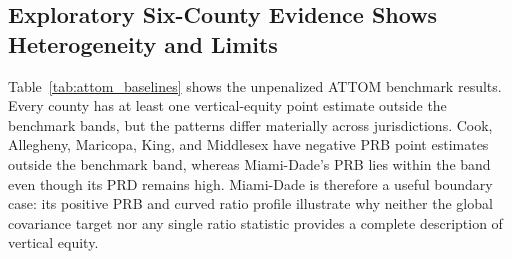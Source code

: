 \documentclass[10pt]{article}
\theoremstyle{definition}
\newcommand{\1}{\mathbf{1}}
\newcommand{\oldtext}[1]{\textcolor{blue}{\sout{#1}}}
\newcommand{\newtext}[1]{\textcolor{impGreen}{#1}}
\begin{document}
\subsection{Exploratory Six-County Evidence Shows Heterogeneity and Limits}
\label{subsec:attom_results}

\newtext{Table~\ref{tab:attom_baselines} shows the unpenalized ATTOM benchmark results. Every county has at least one vertical-equity point estimate outside the benchmark bands, but the patterns differ materially across jurisdictions. Cook, Allegheny, Maricopa, King, and Middlesex have negative PRB point estimates outside the benchmark band, whereas Miami-Dade's PRB lies within the band even though its PRD remains high. Miami-Dade is therefore a useful boundary case: its positive PRB and curved ratio profile illustrate why neither the global covariance target nor any single ratio statistic provides a complete description of vertical equity.}

{\color{impGreen}
\begin{table}[t]
\centering
\caption{Unpenalized LightGBM results in the six-county ATTOM benchmark. These are held-out model-benchmark point estimates, not official assessor results.}
\label{tab:attom_baselines}
\end{table}
}
\end{document}
